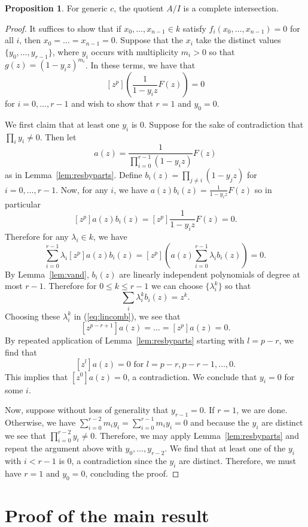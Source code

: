 \documentclass{amsart}
\numberwithin{equation}{section}
\theoremstyle{definition}
\newtheorem{proposition}[theorem]{Proposition}
\begin{document}
\begin{proposition}\label{prop:ci}
For generic $c$, the quotient $A/I$ is a complete intersection. 
\end{proposition}
\begin{proof}
It suffices to show that if $x_0,\dots,x_{n-1} \in k$ satisfy $f_i(x_0,\dots,x_{n-1})=0$ for all $i$, then $x_0=\dots=x_{n-1}=0$.  Suppose that the $x_i$ take the distinct values $\{y_0,\dots,y_{r-1}\}$, where $y_i$ occurs with multiplicity $m_i>0$ so that $g(z)=(1-y_iz)^{m_i}$.  In these terms, we have that 
\[
[z^p]\left(\frac{1}{1-y_iz}F(z)\right)= 0
\]
for $i = 0, \ldots, r - 1$ and wish to show that $r=1$ and $y_0=0$. 

We first claim that at least one $y_i$ is $0$. Suppose for the sake of contradiction that $\prod_i y_i \ne 0$.  Then let
\[
a(z)=\frac{1}{\prod_{i=0}^{r-1}(1-y_iz)}F(z)
\]
as in Lemma~\ref{lem:resbyparts}.  Define $b_i(z)=\prod_{j \ne i} (1-y_jz)$ for $i=0,\dots,r-1$.   Now, for any $i$, we have $a(z)b_i(z)=\frac{1}{1-y_iz}F(z)$ so in particular 
\[
[z^p]a(z)b_i(z)=[z^p]\frac{1}{1-y_iz}F(z)=0.
\]
Therefore for any $\lambda_i \in k$, we have
\begin{equation}\label{eq:lincomb}
\sum_{i=0}^{r-1} \lambda_i[z^p]a(z)b_i(z)=[z^p]\left( a(z)\sum_{i=0}^{r-1}\lambda_ib_i(z)\right)=0.
\end{equation}
By Lemma~\ref{lem:vand}, $b_i(z)$ are linearly independent polynomials of degree at most $r-1$. Therefore for $0 \le k \le r-1$ we can choose $\{\lambda_i^k\}$ so that 
\[
\sum_i\lambda_i^kb_i(z)=z^k.
\]
Choosing these $\lambda_i^k$ in (\ref{eq:lincomb}), we see that
\[
[z^{p-r+1}]a(z)=\dots=[z^p]a(z)=0.
\]
By repeated application of Lemma~\ref{lem:resbyparts} starting with $l=p-r$, we find that 
\[
[z^l]a(z)=0 \text{ for $l=p-r,p-r-1,\dots,0$}.
\]
This implies that $[z^0]a(z)=0$, a contradiction. We conclude that $y_i=0$ for some $i$.

Now, suppose without loss of generality that $y_{r-1}=0$. If $r = 1$, we are done.  Otherwise, we have $\sum_{i=0}^{r-2} m_iy_i = \sum_{i=0}^{r-1} m_iy_i = 0$ and because the $y_i$ are distinct we see that $\prod_{i=0}^{r-2} y_i \ne 0$.  Therefore, we may apply Lemma~\ref{lem:resbyparts} and repeat the argument above with $y_0, \ldots, y_{r - 2}$.  We find that at least one of the $y_i$ with $i < r-1$ is $0$, a contradiction since the $y_i$ are distinct. Therefore, we must have $r=1$ and $y_0=0$, concluding the proof.
\end{proof}

\section{Proof of the main result}
\end{document}

